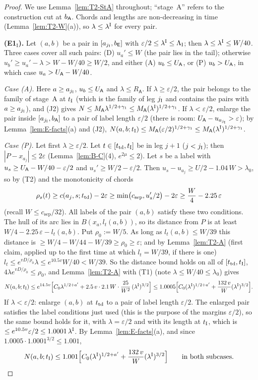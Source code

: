 \begin{proof}
We use Lemma~\ref{lem:T2-StA} throughout; ``stage~A'' refers to the construction cut at $b_{\mathsf A}$. Chords and lengths are
non-decreasing in time (Lemma~\ref{lem:T2-W}(a)), so $\lambda\le\lambda^{\mathrm I}$ for every pair.

\smallskip\textbf{(E1$_{\mathrm I}$).} Let $(a,b)$ be a pair in $[a_{j_{\mathrm I}},b_{\mathsf E}]$ with $\varepsilon/2\le\lambda^{\mathrm I}\le\Lambda_{\mathrm I}$; then
$\lambda\le\lambda^{\mathrm I}\le W/40$. Three cases cover all such pairs: (D) $u_a'\le W$ (the pair lies in the tail); otherwise
$u_b'\ge u_a'-\lambda>W-W/40\ge W/2$, and either (A) $u_b\le U_{\mathsf A}$, or (P) $u_b>U_{\mathsf A}$, in which case $u_a>U_{\mathsf A}-W/40$.

\emph{Case \textup{(A)}.} Here $a\ge a_{j_{\mathrm I}}$, $u_b\le U_{\mathsf A}$ and $\lambda\le R_{\mathsf A}$. If $\lambda\ge\varepsilon/2$, the pair
belongs to the family of stage~A at $t_{\mathrm I}$ (which is the family of leg $j_{\mathrm I}$ and contains the pairs with $a\ge a_{j_{\mathrm I}}$), and
(J2) gives $N\le M_{\mathsf A}\lambda^{1/2+\gamma_1}\le M_{\mathsf A}(\lambda^{\mathrm I})^{1/2+\gamma_1}$. If $\lambda<\varepsilon/2$, enlarge the
pair inside $[a_{j_{\mathrm I}},b_{\mathsf A}]$ to a pair of label length $\varepsilon/2$ (there is room: $U_{\mathsf A}-u_{a_{j_{\mathrm I}}}>\varepsilon$); by
Lemma~\ref{lem:E-facts}(a) and (J2), $N(a,b;t_{\mathrm I})\le M_{\mathsf A}(\varepsilon/2)^{1/2+\gamma_1}\le M_{\mathsf A}(\lambda^{\mathrm I})^{1/2+\gamma_1}$.

\emph{Case \textup{(P)}.} Let first $\lambda\ge\varepsilon/2$. Let $t\in[t_{\mathrm{td}},t_{\mathrm I}]$ be in leg $j+1$ ($j<j_{\mathrm I}$); then
$|P-x_{a_j}|\le2\varepsilon$ (Lemma~\ref{lem:B-C}(4), $e^{2\mu}\le2$). Let $s$ be a label with
$u_s\ge U_{\mathsf A}-W/40-\varepsilon/2$ and $u_s'\ge W/2-\varepsilon/2$. Then $u_s-u_{a_j}\ge U/2-1.04\,W>\lambda_0$, so by (T2) and the
monotonicity of chords
\[
\rho_s(t)\ge c(a_j,s;t_{\mathrm{td}})-2\varepsilon\ge\min\bigl(c_{\mathrm{sep}},u_s'/2\bigr)-2\varepsilon\ge\frac W4-2.25\,\varepsilon
\]
(recall $W\le c_{\mathrm{sep}}/32$). All labels of the pair $(a,b)$ satisfy these two conditions. The hull of its arc lies in
$B(x_a,l_t(a,b))$, so its distance from $P$ is at least $W/4-2.25\,\varepsilon-l_t(a,b)$. Put $\rho_0:=W/5$. As long as
$l_t(a,b)\le W/39$ this distance is $\ge W/4-W/44-W/39\ge\rho_0\ge\varepsilon$; and by Lemma~\ref{lem:T2-A} (first claim,
applied up to the first time at which $l_t=W/39$, if there is one) $l_t\le e^{vD/\rho_0}\lambda\le e^{10.5v}W/40<W/39$. So the
distance bound holds on all of $[t_{\mathrm{td}},t_{\mathrm I}]$, $4\lambda e^{vD/\rho_0}\le\rho_0$, and Lemma~\ref{lem:T2-A} with (T1) (note
$\lambda\le W/40\le\lambda_0$) gives
\[
N(a,b;t_{\mathrm I})\le e^{14.5v}\Bigl[C_0\lambda^{1/2+a'}+2.5\,v\cdot2.1\,W\cdot\frac{25}{W^2}\,(\lambda^{\mathrm I})^{3/2}\Bigr]
\le1.0005\Bigl[C_0(\lambda^{\mathrm I})^{1/2+a'}+\frac{132\,v}W(\lambda^{\mathrm I})^{3/2}\Bigr].
\]
If $\lambda<\varepsilon/2$: enlarge $(a,b)$ at $t_{\mathrm{td}}$ to a pair of label length $\varepsilon/2$. The enlarged pair satisfies the
label conditions just used (this is the purpose of the margins $\varepsilon/2$), so the same bound holds for it, with
$\lambda=\varepsilon/2$ and with its length at $t_{\mathrm I}$, which is $\le e^{10.5v}\varepsilon/2\le1.0001\,\lambda^{\mathrm I}$. By
Lemma~\ref{lem:E-facts}(a), and since $1.0005\cdot1.0001^{3/2}\le1.001$,
\[
N(a,b;t_{\mathrm I})\le1.001\Bigl[C_0(\lambda^{\mathrm I})^{1/2+a'}+\frac{132\,v}W(\lambda^{\mathrm I})^{3/2}\Bigr]\qquad\text{in both subcases.}
\]


\end{proof}
